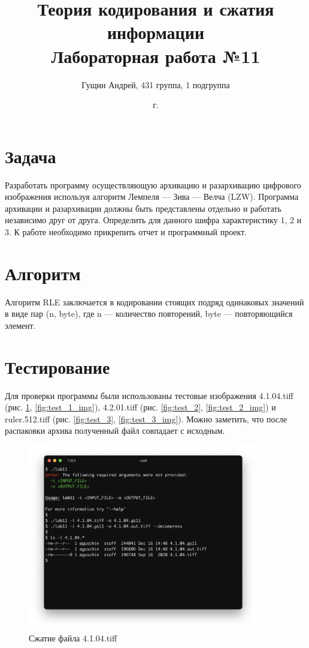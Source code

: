 \documentclass[a4paper,oneside]{article}
\title{{Теория кодирования и сжатия информации}\\{Лабораторная работа №11}}
\author{Гущин Андрей, 431 группа, 1 подгруппа}
\date{\the\year{} г.}
\theoremstyle{definition}
\begin{document}
\maketitle

\section{Задача}

Разработать программу осуществляющую архивацию и разархивацию цифрового
изображения используя алгоритм Лемпеля --- Зива --- Велча (LZW). Программа
архивации и разархивации должны быть представлены отдельно и работать независимо
друг от друга. Определить для данного шифра характеристику 1, 2 и 3. К работе
необходимо прикрепить отчет и программный проект.

\section{Алгоритм}

Алгоритм RLE заключается в кодировании стоящих подряд одинаковых значений
в виде пар (n, byte), где n --- количество повторений, byte --- повторяющийся
элемент.


\section{Тестирование}

Для проверки программы были использованы тестовые изображения 4.1.04.tiff
(рис. \ref{fig:test_1}, \ref{fig:test_1_img}), 4.2.01.tiff (рис.
\ref{fig:test_2}, \ref{fig:test_2_img}) и ruler.512.tiff (рис. \ref{fig:test_3},
\ref{fig:test_3_img}). Можно заметить, что после распаковки архива полученный
файл совпадает с исходным.

\begin{figure}[H]
  \centering
  \includegraphics[width=0.9\textwidth]{test1.jpg}
  \caption{Сжатие файла 4.1.04.tiff}
  \label{fig:test_1}
\end{figure}
\end{document}
